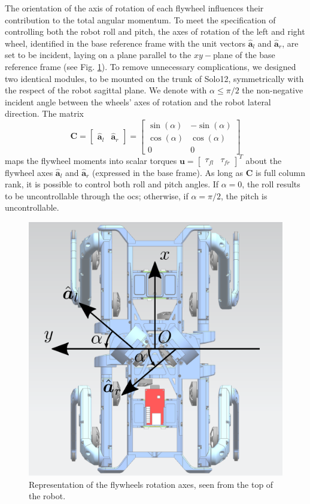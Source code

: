 \documentclass[letterpaper, 10 pt, conference]{ieeeconf}      %
\begin{document}
The orientation of the axis of rotation of each flywheel influences their contribution to the total angular momentum. To meet the specification of controlling both the robot roll and pitch, the axes of rotation of the left and right wheel, identified in the base reference frame with the unit vectors $\hat{\bm{a}}_l$ and $\hat{\bm{a}}_r$, are set to be incident, laying on a plane parallel to the $xy-$plane of the base reference frame (see Fig. \ref{fig:axes}). 
To remove unnecessary complications, we designed two identical modules, to be mounted on the trunk of Solo12, symmetrically with the respect of the robot sagittal plane. We denote with $\alpha \leq \pi/2$ the non-negative incident angle between the wheels' axes of rotation and the robot lateral direction. The matrix 
\begin{equation}
\bm{C} = 
\left[ \begin{array}{cc}
\hat{\bm{a}}_l & \hat{\bm{a}}_r
\end{array} \right] = 
\left[ \begin{array}{cc}
\sin(\alpha) & -\sin(\alpha) \\
\cos(\alpha) & \cos(\alpha) \\
0 & 0
\end{array} \right]
\end{equation}
maps the flywheel moments into scalar torques $\bm{u} = \left[\begin{array}{cc} \tau_{fl} & \tau_{fr} \end{array} \right]^T$ about the flywheel axes $\hat{\bm{a}}_l$ and $\hat{\bm{a}}_r$ (expressed in the base frame).
As long as $\bm{C}$ is full column rank, it is possible to control both roll and pitch angles. If $\alpha = 0$, the roll results to be uncontrollable through the \gls{ocs}; otherwise, if $\alpha = \pi/2$, the pitch is uncontrollable. 
\begin{figure}
	\centering
	\includegraphics[width=0.7\linewidth]{figures/axes.eps}
	\caption{\small Representation of the flywheels rotation axes, seen from the top of the robot.}
	\label{fig:axes}
\end{figure}
\end{document}
